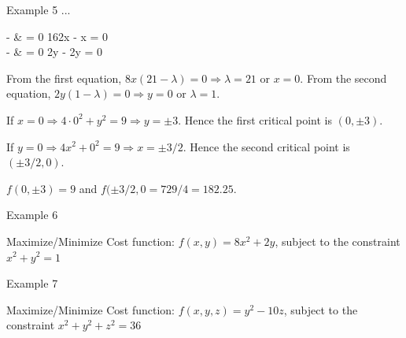 \documentclass[aspectratio=169,xcolor=dvipsnames,svgnames,x11names,fleqn]{beamer}
\begin{document}
\begin{frame}{Example 5 ...}
\begin{multiequation}
 - \lambda {} & = 0 \Rightarrow 162x  -  x = 0\\
 - \lambda {} & = 0 \Rightarrow 2y  - \lambda 2y = 0
\end{multiequation}
From the first equation, $8x(21 - \lambda) = 0 \Rightarrow \lambda = 21 $ or $x = 0$.
From the second equation, $2y(1 - \lambda) = 0 \Rightarrow y = 0$ or $\lambda = 1$.

If $x = 0 \Rightarrow 4\cdot 0^2 + y^2 = 9 \Rightarrow y = \pm 3$. Hence the first critical point is $(0, \pm 3)$.

If $y = 0 \Rightarrow 4 x^2 + 0^2 = 9 \Rightarrow x = \pm 3/2$. Hence the second critical point is $(\pm 3/2, 0)$.

$f(0, \pm 3) = 9$ and $f(\pm 3/2, 0 = 729/4 = 182.25$. 


\end{frame}


\begin{frame}{Example 6}

\begin{tblock}{Maximize/Minimize}
Cost function: $f(x, y) = 8x^2 + 2y$, subject to the constraint $x^2 + y^2 = 1$    
\end{tblock}
\end{frame}

\begin{frame}{}

\end{frame}

\begin{frame}{}

\end{frame}

\begin{frame}{Example 7}

\begin{tblock}{Maximize/Minimize}
Cost function: $f(x, y, z) = y^2 - 10 z$, subject to the constraint $x^2 + y^2 + z^2 = 36$    
\end{tblock}

\end{frame}

\begin{frame}{}

\end{frame}
\end{document}
